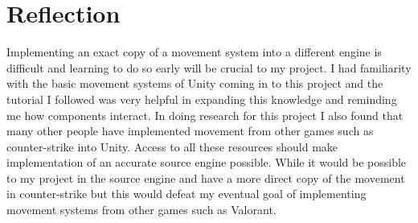 \documentclass[10pt,twocolumn]{article}
\begin{document}
\section{Reflection}

Implementing an exact copy of a movement system into a different engine is difficult and learning to do so early will be crucial to my project. I had familiarity with the basic movement systems of Unity coming in to this project and the tutorial I followed was very helpful in expanding this knowledge and reminding me how components interact. In doing research for this project I also found that many other people have implemented movement from other games such as counter-strike into Unity. Access to all these resources should make implementation of an accurate source engine possible. While it would be possible to my project in the source engine and have a more direct copy of the movement in counter-strike but this would defeat my eventual goal of implementing movement systems from other games such as Valorant.

\printbibliography
\end{document}
